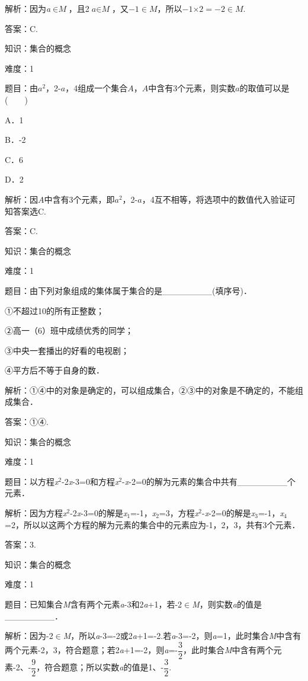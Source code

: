 \documentclass{article} %
\begin{document}
解析：因为\textit{a}$\mathrm{\in}\textit{M}$，且2$\textit{a}\mathrm{\in}\textit{M}$，又$-1\mathrm{\in}\textit{M}$，所以$-1\mathrm{\times}2=-2\mathrm{\in}\textit{M}$.

答案：C.

知识：集合的概念

难度：1

题目：由$\textit{a}{}^{2}$，2-$\textit{a}$，4组成一个集合$\textit{A}$，$\textit{A}$中含有3个元素，则实数$\textit{a}$的取值可以是(　　)

A．1  

B．-2  

C．6  

D．2

解析：因$\textit{A}$中含有3个元素，即$\textit{a}{}^{2}$，2-$\textit{a}$，4互不相等，将选项中的数值代入验证可知答案选C.

答案：C.

知识：集合的概念

难度：1

题目：由下列对象组成的集体属于集合的是\_\_\_\_\_\_\_\_(填序号)．

①不超过10的所有正整数；

②高一（6）班中成绩优秀的同学；

③中央一套播出的好看的电视剧；

④平方后不等于自身的数．

解析：①④中的对象是确定的，可以组成集合，②③中的对象是不确定的，不能组成集合．

答案：①④.

知识：集合的概念

难度：1

题目：以方程\textit{x}${}^{2}$-2\textit{x}-3=0和方程\textit{x}${}^{2}$-\textit{x}-2=0的解为元素的集合中共有\_\_\_\_\_\_\_\_个元素．

解析：因为方程\textit{x}${}^{2}$-2\textit{x}-3=0的解是\textit{x}${}_{1}$=-1，\textit{x}${}_{2}$=3，方程\textit{x}${}^{2}$-\textit{x}-2=0的解是\textit{x}${}_{3}$=-1，\textit{x}${}_{4}$=2，所以以这两个方程的解为元素的集合中的元素应为-1，2，3，共有3个元素．

答案：3.

知识：集合的概念

难度：1

题目：已知集合\textit{M}含有两个元素\textit{a}-3和2\textit{a}+1，若-2$\mathrm{\in}$\textit{M}，则实数\textit{a}的值是\_\_\_\_\_\_\_\_．

解析：因为-2$\mathrm{\in}$\textit{M}，所以\textit{a}-3=-2或2\textit{a}+1=-2.若\textit{a}-3=-2，则\textit{a}=1，此时集合\textit{M}中含有两个元素-2，3，符合题意；若2\textit{a}+1=-2，则\textit{a}=-$\dfrac{3}{2}$，此时集合\textit{M}中含有两个元素-2、-$\dfrac{9}{2}$，符合题意；所以实数\textit{a}的值是1、-$\dfrac{3}{2}$.
\end{document}
